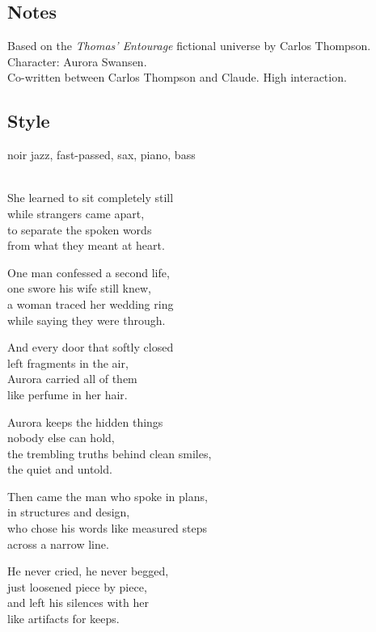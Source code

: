 \subsection{Notes}
Based on the \emph{Thomas' Entourage} fictional universe by Carlos Thompson.\\
Character: Aurora Swansen.\\
Co-written between Carlos Thompson and Claude. High interaction.

\subsection{Style}
noir jazz, fast-passed, sax, piano, bass

\begin{lyrics}

\\
She learned to sit completely still\\
while strangers came apart,\\
to separate the spoken words\\
from what they meant at heart.

One man confessed a second life,\\
one swore his wife still knew,\\
a woman traced her wedding ring\\
while saying they were through.

And every door that softly closed\\
left fragments in the air,\\
Aurora carried all of them\\
like perfume in her hair.

Aurora keeps the hidden things\\
nobody else can hold,\\
the trembling truths behind clean smiles,\\
the quiet and untold.

Then came the man who spoke in plans,\\
in structures and design,\\
who chose his words like measured steps\\
across a narrow line.

He never cried, he never begged,\\
just loosened piece by piece,\\
and left his silences with her\\
like artifacts for keeps.


\end{lyrics}
